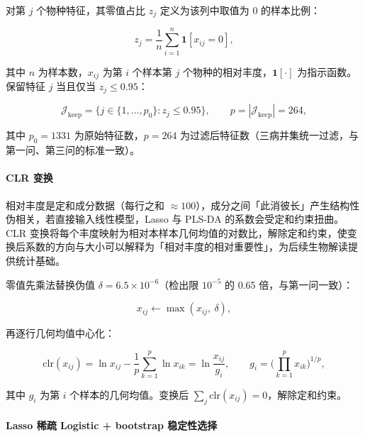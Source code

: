 \documentclass{../../latex/templates/mcm-paper}
\begin{document}
对第 $j$ 个物种特征，其零值占比 $z_j$ 定义为该列中取值为 0 的样本比例：

\begin{equation}
z_j = \frac{1}{n}\sum_{i=1}^{n}\mathbf{1}[x_{ij}=0],
\label{eq:s2-zerofrac}
\end{equation}

其中 $n$ 为样本数，$x_{ij}$ 为第 $i$ 个样本第 $j$ 个物种的相对丰度，$\mathbf{1}[\cdot]$ 为指示函数。保留特征 $j$ 当且仅当 $z_j\le 0.95$：

\begin{equation}
\mathcal{J}_{\text{keep}} = \big\{ j\in\{1,\dots,p_0\}: z_j\le 0.95 \big\},
  \qquad
  p = |\mathcal{J}_{\text{keep}}| = 264,
\label{eq:s2-filter}
\end{equation}

其中 $p_0=1331$ 为原始特征数，$p=264$ 为过滤后特征数（三病并集统一过滤，与第一问、第三问的标准一致）。

\paragraph{CLR 变换}

相对丰度是定和成分数据（每行之和 $\approx 100$），成分之间「此消彼长」产生结构性伪相关，若直接输入线性模型，Lasso 与 PLS-DA 的系数会受定和约束扭曲。CLR 变换将每个丰度映射为相对本样本几何均值的对数比，解除定和约束，使变换后系数的方向与大小可以解释为「相对丰度的相对重要性」，为后续生物解读提供统计基础。

零值先乘法替换伪值 $\delta=6.5\times10^{-6}$（检出限 $10^{-5}$ 的 0.65 倍，与第一问一致）：

\begin{equation}
x_{ij} \leftarrow \max(x_{ij},\ \delta),
\label{eq:s2-zeroreplace}
\end{equation}

再逐行几何均值中心化：

\begin{equation}
\mathrm{clr}(x_{ij}) = \ln x_{ij} - \frac{1}{p}\sum_{k=1}^{p}\ln x_{ik}
  = \ln\frac{x_{ij}}{g_i},
  \qquad
  g_i = \Big(\prod_{k=1}^{p} x_{ik}\Big)^{1/p},
\label{eq:s2-clr}
\end{equation}

其中 $g_i$ 为第 $i$ 个样本的几何均值。变换后 $\sum_j \mathrm{clr}(x_{ij})=0$，解除定和约束。

\paragraph{Lasso 稀疏 Logistic + bootstrap 稳定性选择}
\end{document}
